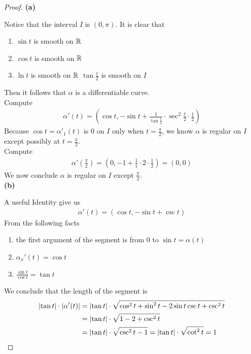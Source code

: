 \documentclass{report}
\begin{document}
\begin{proof}
\textbf{(a)}

Notice that the interval $I$ is  $(0,\pi)$. It is clear that 
\begin{enumerate}[label=(\alph*)]
  \item $\sin t$ is smooth on $\mathbb{R}$
  \item $\cos t$ is smooth on $\mathbb{R}$
  \item $\ln t$ is smooth on $\mathbb{R}$
  $\tan \frac{t}{2}$ is smooth on $I$
\end{enumerate}
Then it follows that $\alpha $ is a differentiable curve.\\

Compute 
\begin{align*}
\alpha '(t)=(\cos t,- \sin t + \frac{1}{\tan \frac{t}{2}} \cdot \sec^2 \frac{t}{2}\cdot \frac{1}{2})
\end{align*}
Because $\cos t=\alpha '_1(t)$ is $0$ on  $I$ only when  $t=\frac{\pi}{2}$, we know $\alpha $ is regular on $I$ except possibly at  $t=\frac{\pi}{2}$.\\

Compute 
\begin{align*}
\alpha '(\frac{\pi}{2})=(0,-1+\frac{1}{1}\cdot 2 \cdot \frac{1}{2} )=(0,0)
\end{align*}
We now conclude $\alpha $ is regular on $I$ except  $\frac{\pi}{2}$. \\

\textbf{(b)}

A useful Identity give us 
\begin{align*}
\alpha '(t)=(\cos t,-\sin t+ \csc t)
\end{align*}
From the following facts
\begin{enumerate}[label=(\alph*)]
  \item the first argument of the segment is from $0$ to  $\sin t =\alpha (t)$
  \item $\alpha_x'(t)=\cos t$
  \item $\frac{\sin t}{\cos t}=\tan t$
\end{enumerate}
We conclude that the length of the segment is 
\begin{align*}
\left|\tan t\right|\cdot \left|\alpha '(t)\right|&= \left|\tan t\right| \cdot \sqrt{\cos ^2 t + \sin^2 t - 2 \sin t \csc t + \csc ^2 t }\\
&=\left|\tan t\right| \cdot \sqrt{1-2+\csc ^2 t}\\
&=\left|\tan t \right| \cdot \sqrt{\csc ^2 t-1}=\left|\tan t \right| \cdot  \sqrt{\cot ^2 t} =1
\end{align*}



\end{proof}
\end{document}
